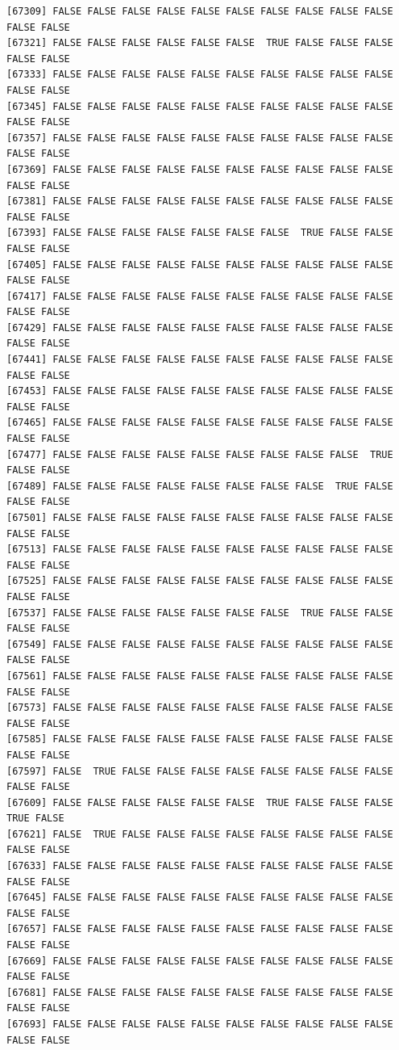 \documentclass[
  a4paper,
  DIV=11,
  numbers=noendperiod]{scrartcl}
\begin{document}
\begin{verbatim}
[67309] FALSE FALSE FALSE FALSE FALSE FALSE FALSE FALSE FALSE FALSE FALSE FALSE
[67321] FALSE FALSE FALSE FALSE FALSE FALSE  TRUE FALSE FALSE FALSE FALSE FALSE
[67333] FALSE FALSE FALSE FALSE FALSE FALSE FALSE FALSE FALSE FALSE FALSE FALSE
[67345] FALSE FALSE FALSE FALSE FALSE FALSE FALSE FALSE FALSE FALSE FALSE FALSE
[67357] FALSE FALSE FALSE FALSE FALSE FALSE FALSE FALSE FALSE FALSE FALSE FALSE
[67369] FALSE FALSE FALSE FALSE FALSE FALSE FALSE FALSE FALSE FALSE FALSE FALSE
[67381] FALSE FALSE FALSE FALSE FALSE FALSE FALSE FALSE FALSE FALSE FALSE FALSE
[67393] FALSE FALSE FALSE FALSE FALSE FALSE FALSE  TRUE FALSE FALSE FALSE FALSE
[67405] FALSE FALSE FALSE FALSE FALSE FALSE FALSE FALSE FALSE FALSE FALSE FALSE
[67417] FALSE FALSE FALSE FALSE FALSE FALSE FALSE FALSE FALSE FALSE FALSE FALSE
[67429] FALSE FALSE FALSE FALSE FALSE FALSE FALSE FALSE FALSE FALSE FALSE FALSE
[67441] FALSE FALSE FALSE FALSE FALSE FALSE FALSE FALSE FALSE FALSE FALSE FALSE
[67453] FALSE FALSE FALSE FALSE FALSE FALSE FALSE FALSE FALSE FALSE FALSE FALSE
[67465] FALSE FALSE FALSE FALSE FALSE FALSE FALSE FALSE FALSE FALSE FALSE FALSE
[67477] FALSE FALSE FALSE FALSE FALSE FALSE FALSE FALSE FALSE  TRUE FALSE FALSE
[67489] FALSE FALSE FALSE FALSE FALSE FALSE FALSE FALSE  TRUE FALSE FALSE FALSE
[67501] FALSE FALSE FALSE FALSE FALSE FALSE FALSE FALSE FALSE FALSE FALSE FALSE
[67513] FALSE FALSE FALSE FALSE FALSE FALSE FALSE FALSE FALSE FALSE FALSE FALSE
[67525] FALSE FALSE FALSE FALSE FALSE FALSE FALSE FALSE FALSE FALSE FALSE FALSE
[67537] FALSE FALSE FALSE FALSE FALSE FALSE FALSE  TRUE FALSE FALSE FALSE FALSE
[67549] FALSE FALSE FALSE FALSE FALSE FALSE FALSE FALSE FALSE FALSE FALSE FALSE
[67561] FALSE FALSE FALSE FALSE FALSE FALSE FALSE FALSE FALSE FALSE FALSE FALSE
[67573] FALSE FALSE FALSE FALSE FALSE FALSE FALSE FALSE FALSE FALSE FALSE FALSE
[67585] FALSE FALSE FALSE FALSE FALSE FALSE FALSE FALSE FALSE FALSE FALSE FALSE
[67597] FALSE  TRUE FALSE FALSE FALSE FALSE FALSE FALSE FALSE FALSE FALSE FALSE
[67609] FALSE FALSE FALSE FALSE FALSE FALSE  TRUE FALSE FALSE FALSE  TRUE FALSE
[67621] FALSE  TRUE FALSE FALSE FALSE FALSE FALSE FALSE FALSE FALSE FALSE FALSE
[67633] FALSE FALSE FALSE FALSE FALSE FALSE FALSE FALSE FALSE FALSE FALSE FALSE
[67645] FALSE FALSE FALSE FALSE FALSE FALSE FALSE FALSE FALSE FALSE FALSE FALSE
[67657] FALSE FALSE FALSE FALSE FALSE FALSE FALSE FALSE FALSE FALSE FALSE FALSE
[67669] FALSE FALSE FALSE FALSE FALSE FALSE FALSE FALSE FALSE FALSE FALSE FALSE
[67681] FALSE FALSE FALSE FALSE FALSE FALSE FALSE FALSE FALSE FALSE FALSE FALSE
[67693] FALSE FALSE FALSE FALSE FALSE FALSE FALSE FALSE FALSE FALSE FALSE FALSE

\end{verbatim}
\end{document}
